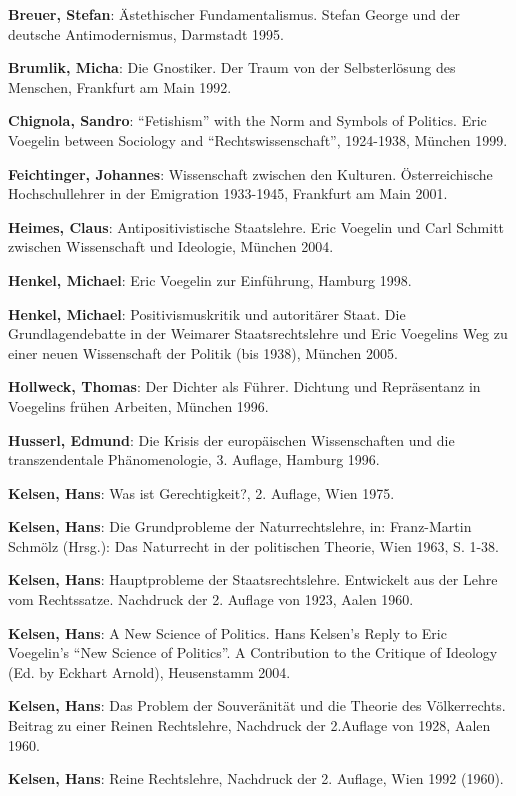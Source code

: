 \documentclass[12pt,a4paper,ngerman]{article}
\begin{document}
{\bf Breuer, Stefan}: Ästethischer Fundamentalismus. Stefan George und der
deutsche Antimodernismus, Darmstadt 1995.

{\bf Brumlik, Micha}: Die Gnostiker. Der Traum von der Selbsterlösung
des Menschen, Frankfurt am Main 1992.

{\bf Chignola, Sandro}: "`Fetishism"' with the Norm and Symbols of Politics.
Eric Voegelin between Sociology and "`Rechtswissenschaft"', 1924-1938, München
1999.

{\bf Feichtinger, Johannes}: Wissenschaft zwischen den Kulturen.
Österreichische Hochschullehrer in der Emigration 1933-1945, Frankfurt am Main
2001.

{\bf Heimes, Claus}: Antipositivistische Staatslehre. Eric Voegelin und Carl
Schmitt zwischen Wissenschaft und Ideologie, München 2004.

{\bf Henkel, Michael}: Eric Voegelin zur Einführung, Hamburg 1998.

{\bf Henkel, Michael}: Positivismuskritik und autoritärer Staat. Die
Grundlagendebatte in der Weimarer Staatsrechtslehre und Eric Voegelins Weg zu
einer neuen Wissenschaft der Politik (bis 1938), München 2005.

{\bf Hollweck, Thomas}: Der Dichter als Führer. Dichtung und Repräsentanz
  in Voegelins frühen Arbeiten, München 1996.

{\bf Husserl, Edmund}: Die Krisis der europäischen Wissenschaften und die
transzendentale Phänomenologie, 3. Auflage, Hamburg 1996.

{\bf Kelsen, Hans}: Was ist Gerechtigkeit?, 2. Auflage, Wien 1975.

{\bf Kelsen, Hans}: Die Grundprobleme der Naturrechtslehre, in: Franz-Martin
Schmölz (Hrsg.): Das Naturrecht in der politischen Theorie, Wien 1963, S.
1-38.

{\bf Kelsen, Hans}: Hauptprobleme der Staatsrechtslehre. Entwickelt aus der
Lehre vom Rechtssatze.  Nachdruck der 2. Auflage von 1923, Aalen 1960.

{\bf Kelsen, Hans}: A New Science of Politics. Hans Kelsen's Reply to Eric
Voegelin's "`New Science of Politics"'. A Contribution to the Critique of
Ideology (Ed. by Eckhart Arnold), Heusenstamm 2004.

{\bf Kelsen, Hans}: Das Problem der Souveränität und die Theorie des
Völkerrechts. Beitrag zu einer Reinen Rechtslehre, Nachdruck der 2.Auflage von
1928, Aalen 1960.

{\bf Kelsen, Hans}: Reine Rechtslehre, Nachdruck der 2. Auflage, Wien 1992
(1960).
\end{document}
